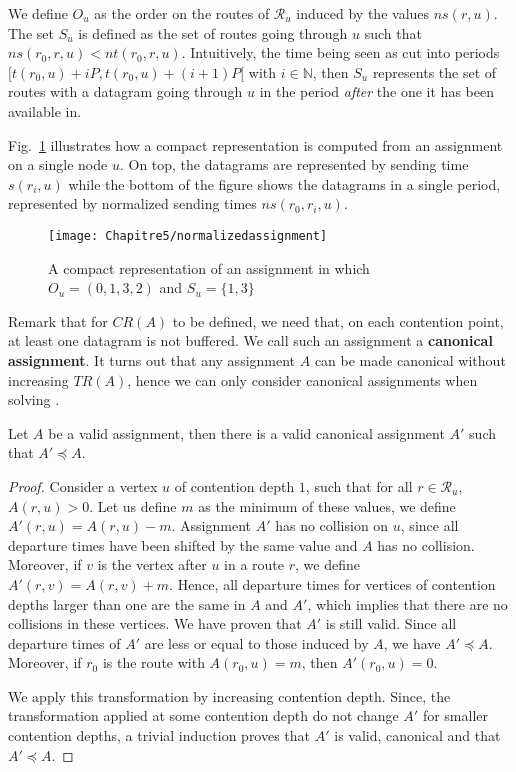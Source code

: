 We define $O_u$ as the order on the routes of $\mathcal{R}_u$ induced by the values $ns(r,u)$. The set $S_u$ is defined as the set of routes going through $u$ such that $ns(r_0,r,u) < nt(r_0,r,u)$. Intuitively, the time being seen as cut into periods $[t(r_0,u) + iP,t(r_0,u) + (i+1)P [$ with $i \in \mathbb{N}$, then $S_u$ represents the set of routes with a datagram going through $u$ in the period \emph{after} the one it has been available in. 

Fig.~\ref{fig:normalizedassignment} illustrates how a compact representation is computed from an assignment on a single node $u$. On top, the datagrams are represented by sending time $s(r_i,u)$ while the bottom of the figure shows the datagrams in a single period, represented by normalized sending times $ns(r_0,r_i,u)$.  
\begin{figure}[!h]
	\centering
	\texttt{[image: Chapitre5/normalizedassignment]}
\caption{A compact representation of an assignment in which $O_u = (0,1,3,2)$ and $S_u = \{1,3\}$ }
\label{fig:normalizedassignment}
\end{figure}


Remark that for $CR(A)$ to be defined, we need that, on each contention point, at least one datagram is not buffered. We call such an assignment a \textbf{canonical assignment}. It turns out that any assignment $A$ can be made canonical without increasing $TR(A)$, hence we can only consider canonical assignments when solving \minstra.

\begin{lemma}\label{lemma:canonical_min}
Let $A$ be a valid assignment, then there is a valid canonical assignment $A'$ such that $A' \preceq A$.
\end{lemma}
\begin{proof}
Consider a vertex $u$ of contention depth $1$, such that for all $r \in \mathcal{R}_u$, $A(r,u) > 0$. Let us define $m$ as the minimum of these values, we define $A'(r,u) = A(r,u) - m$. Assignment $A'$ has no collision on $u$, since all departure times have been shifted by the same value and $A$ has no collision. Moreover, if $v$ is the vertex after $u$ in a route $r$, we define  $A'(r,v) = A(r,v) + m$. Hence, all departure times for vertices of contention depths larger than one are the same in $A$ and $A'$, which implies that there are no collisions in these vertices. We have proven that $A'$ is still valid. Since all departure times of $A'$ are less or equal to those induced by $A$, we have $A' \preceq A$. Moreover, if $r_0$ is the route with $A(r_0,u) = m$, then $A'(r_0,u) = 0$. 

We apply this transformation by increasing contention depth. Since, the transformation applied at some contention depth do not change $A'$ for smaller contention depths, a trivial induction proves that $A'$ is valid, canonical and that $A' \preceq A$.
\end{proof}


